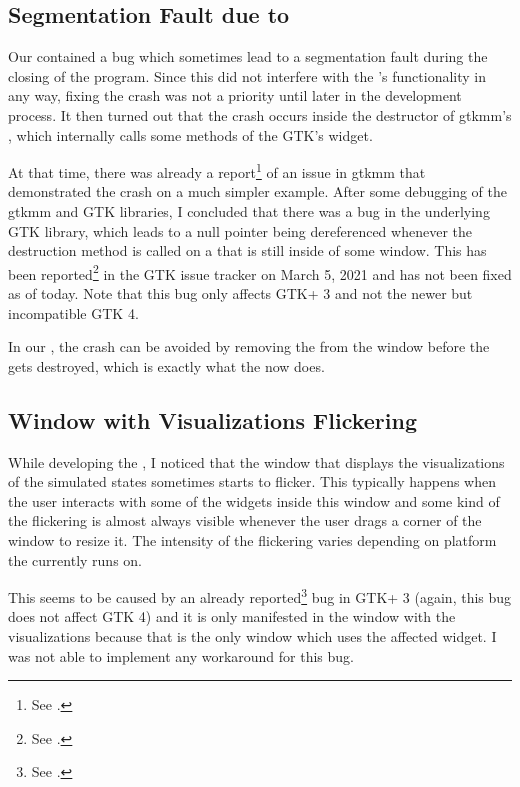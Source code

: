 \documentclass[11pt,a4paper,twoside,openright]{report}
\begin{document}
\subsection{Segmentation Fault due to }

Our \software{} contained a bug which sometimes lead to a segmentation fault during the closing of the program. Since this did not interfere with the \software{}'s functionality in any way, fixing the crash was not a priority until later in the development process. It then turned out that the crash occurs inside the destructor of gtkmm's , which internally calls some methods of the GTK's  widget.

At that time, there was already a report\footnote{See \cite{GtkmmSwitchReport}.} of an issue in gtkmm that demonstrated the crash on a much simpler example. After some debugging of the gtkmm and GTK libraries, I concluded that there was a bug in the underlying GTK library, which leads to a null pointer being dereferenced whenever the destruction method is called on a  that is still inside of some window. This has been reported\footnote{See \cite{GtkSwitchReport}.} in the GTK issue tracker on March 5, 2021 and has not been fixed as of today. Note that this bug only affects GTK+ 3 and not the newer but incompatible GTK 4.

In our \software{}, the crash can be avoided by removing the  from the window before the  gets destroyed, which is exactly what the \software{} now does.

\subsection{Window with Visualizations Flickering}
While developing the \software{}, I noticed that the window that displays the visualizations of the simulated states sometimes starts to flicker. This typically happens when the user interacts with some of the widgets inside this window and some kind of the flickering is almost always visible whenever the user drags a corner of the window to resize it. The intensity of the flickering varies depending on platform the \software{} currently runs on.

This seems to be caused by an already reported\footnote{See \cite{GtkFlickerReport}.} bug in GTK+ 3 (again, this bug does not affect GTK 4) and it is only manifested in the window with the visualizations because that is the only window which uses the affected  widget. I was not able to implement any workaround for this bug.
\end{document}
